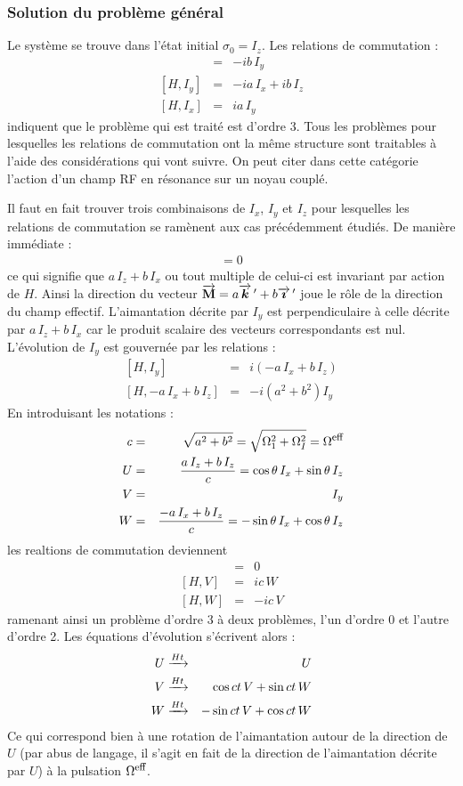 \subsubsection{Solution du problème général}
Le système se trouve dans l'état initial $\sigma_0 = I_z$.
Les relations de commutation :
\begin{eqnarray}
[H, I_z] & = & -ib \, I_y \\
{[H, I_y]} & = & -ia \, I_x  + ib \, I_z \\
{[H, I_x]} & = & ia \, I_y 
\end{eqnarray}
indiquent que le problème qui est traité est d'ordre 3.
Tous les problèmes pour lesquelles les relations de commutation
ont la même structure sont traitables à l'aide des considérations qui vont suivre.
On peut citer dans cette catégorie l'action d'un champ RF en résonance
sur un noyau couplé.

Il faut en fait trouver trois combinaisons de $I_x$, $I_y$ et $I_z$
pour lesquelles les relations de commutation se ramènent aux cas précédemment étudiés.
De manière immédiate :
\begin{eqnarray}
[H, a \, I_z + b \, I_x] = 0
\end{eqnarray}
ce qui signifie que $a \, I_z + b \, I_x$ ou tout multiple de celui-ci est
invariant par action de $H$.
Ainsi la direction du vecteur $\overrightarrow{\mathbf{M}} = a\overrightarrow{\boldsymbol{k}} \, ' + b\overrightarrow{\boldsymbol{\imath}} \, '$ joue
le rôle de la direction du champ effectif.
L'aimantation décrite par $I_y$ est perpendiculaire à celle décrite par
$a \, I_z + b \, I_x$ car le produit scalaire des vecteurs correspondants est nul.
L'évolution de $I_y$ est gouvernée par les relations :
\begin{eqnarray}
{[H, I_y]} & = &i(-a \, I_x  + b \, I_z) \\
{[H, -a \, I_x  + b \, I_z]} & = & -i (a^2 + b^2) I_y
\end{eqnarray}
En introduisant les notations :
\begin{eqnarray}
c & = & \sqrt{a^2 + b^2} = \sqrt{\Omega_1^2 + \Omega_I^2} = \Omega^{\mbox{\footnotesize{eff}}} \\
U & = & \frac{a \, I_z + b \, I_z}{c} = \cos\theta \, I_x + \sin\theta \, I_z \\
V & = & I_y \\
W & = & \frac{-a \, I_x + b \, I_z}{c} = -\sin\theta \, I_x + \cos\theta \, I_z
\end{eqnarray}
les realtions de commutation deviennent
\begin{eqnarray}
[H,U] & = & 0 \\
{[H,V]} & = & ic \, W \\
{[H,W]} & = & -ic \, V
\end{eqnarray}
ramenant ainsi un problème d'ordre 3 à deux problèmes, l'un d'ordre 0
et l'autre d'ordre 2.
Les équations d'évolution s'écrivent alors :
\begin{eqnarray}
U & \xrightarrow{Ht} & U \\
V & \xrightarrow{Ht} & \cos ct \, V + \sin ct \, W \\
W & \xrightarrow{Ht} & -\sin ct \, V + \cos ct \, W
\end{eqnarray}
Ce qui correspond bien à une rotation de l'aimantation autour de la direction de
$U$ (par abus de langage, il s'agit en fait de la direction de l'aimantation décrite par $U$)
à la pulsation $\Omega^{\mbox{\footnotesize{eff}}}$.

